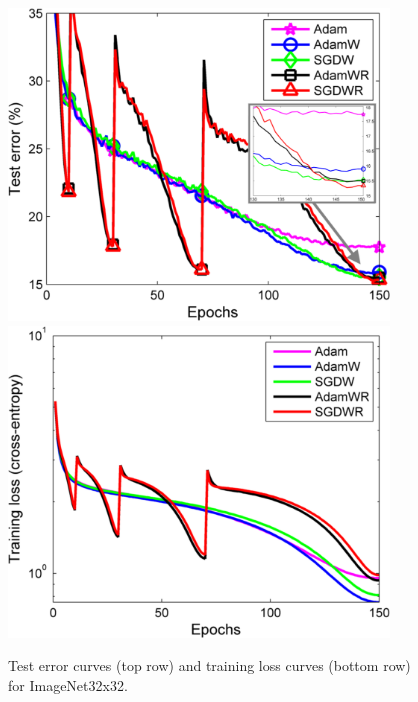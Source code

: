 \documentclass[usenames,dvipsnames]{article} %
\begin{document}
\begin{figure}[t]%
	\includegraphics[width=0.9\textwidth]{restartImageNet_zoom} \\
  \includegraphics[width=0.9\textwidth]{imagenet_training}
\caption{\label{figtrainingImagenet32} Test error curves (top row) and training loss curves (bottom row) for ImageNet32x32.}
\end{figure}

\end{document}
